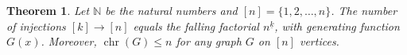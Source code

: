 \documentclass{article}
\newcommand{\bn}[1]{[#1]}
\newcommand{\fall}[2]{#1^{\underline{#2}}}
\newcommand{\Gf}{G(x)}
\DeclareMathOperator{\Chrom}{chr}
\def\NN{\mathbb{N}}
\newtheorem{thm}{Theorem}
\begin{document}
\begin{thm}\label{thm:gf}
Let $\NN$ be the natural numbers and $\bn{n} = \{1, 2, \dots, n\}$. The number
of injections $\bn{k} \to \bn{n}$ equals the falling factorial $\fall{n}{k}$,
with generating function $\Gf$. Moreover, $\Chrom(G) \le n$ for any graph $G$
on $\bn{n}$ vertices.
\end{thm}
\end{document}
